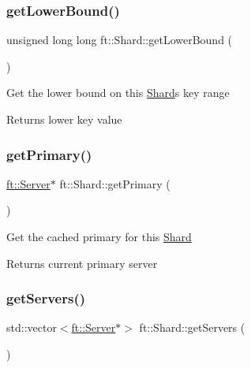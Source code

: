 \subsubsection{\texorpdfstring{get\+Lower\+Bound()}{getLowerBound()}}
{\footnotesize\ttfamily unsigned long long ft\+::\+Shard\+::get\+Lower\+Bound (\begin{DoxyParamCaption}{ }\end{DoxyParamCaption})\hspace{0.3cm}{\ttfamily [inline]}}

Get the lower bound on this \mbox{\hyperlink{classft_1_1Shard}{Shard}}\textquotesingle{}s key range

\begin{DoxyReturn}{Returns}
lower key value 
\end{DoxyReturn}
\mbox{\label{classft_1_1Shard_a76b726de0fb962f51f453c68ebe751e3}} 
\subsubsection{\texorpdfstring{get\+Primary()}{getPrimary()}}
{\footnotesize\ttfamily \mbox{\hyperlink{classft_1_1Server}{ft\+::\+Server}}$\ast$ ft\+::\+Shard\+::get\+Primary (\begin{DoxyParamCaption}{ }\end{DoxyParamCaption})\hspace{0.3cm}{\ttfamily [inline]}}

Get the cached primary for this \mbox{\hyperlink{classft_1_1Shard}{Shard}}

\begin{DoxyReturn}{Returns}
current primary server 
\end{DoxyReturn}
\mbox{\label{classft_1_1Shard_ac06fd0bca4f4254d114401ecb58d744f}} 
\subsubsection{\texorpdfstring{get\+Servers()}{getServers()}}
{\footnotesize\ttfamily std\+::vector$<$\mbox{\hyperlink{classft_1_1Server}{ft\+::\+Server}}$\ast$$>$ ft\+::\+Shard\+::get\+Servers (\begin{DoxyParamCaption}{ }\end{DoxyParamCaption})\hspace{0.3cm}{\ttfamily [inline]}}

